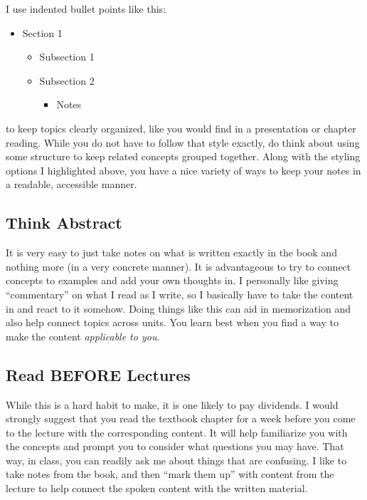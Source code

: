 \documentclass[
  12pt,
  letterpaper,
]{scrartcl}
\providecommand{\tightlist}{%
  \setlength{\itemsep}{0pt}\setlength{\parskip}{0pt}}\usepackage{longtable,booktabs,array}
\begin{document}
I use indented bullet points like this:

\begin{itemize}
\tightlist
\item
  Section 1

  \begin{itemize}
  \tightlist
  \item
    Subsection 1
  \item
    Subsection 2

    \begin{itemize}
    \tightlist
    \item
      Notes
    \end{itemize}
  \end{itemize}
\end{itemize}

to keep topics clearly organized, like you would find in a presentation
or chapter reading. While you do not have to follow that style exactly,
do think about using some structure to keep related concepts grouped
together. Along with the styling options I highlighted above, you have a
nice variety of ways to keep your notes in a readable, accessible
manner.

\subsection{Think Abstract}\label{think-abstract}

It is very easy to just take notes on what is written exactly in the
book and nothing more (in a very concrete manner). It is advantageous to
try to connect concepts to examples and add your own thoughts in. I
personally like giving ``commentary'' on what I read as I write, so I
basically have to take the content in and react to it somehow. Doing
things like this can aid in memorization and also help connect topics
across units. You learn best when you find a way to make the content
\emph{applicable to you}.

\subsection{Read BEFORE Lectures}\label{read-before-lectures}

While this is a hard habit to make, it is one likely to pay dividends. I
would strongly suggest that you read the textbook chapter for a week
before you come to the lecture with the corresponding content. It will
help familiarize you with the concepts and prompt you to consider what
questions you may have. That way, in class, you can readily ask me about
things that are confusing. I like to take notes from the book, and then
``mark them up'' with content from the lecture to help connect the
spoken content with the written material.
\end{document}
